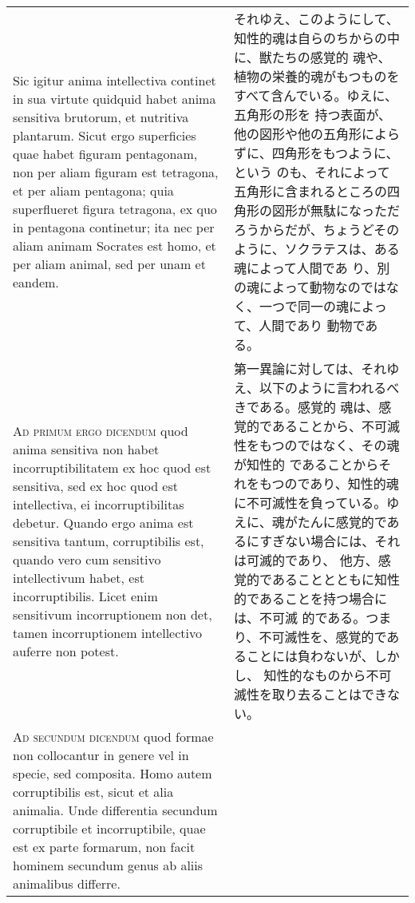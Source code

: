\documentclass[paper=a4paper,fontsize=10pt,jafontsize=9pt,titlepage]{jlreq}
\begin{document}
\begin{longtable}{p{21em}p{21em}}
\\

 Sic igitur anima intellectiva continet in sua virtute quidquid habet
 anima sensitiva brutorum, et nutritiva plantarum. Sicut ergo
 superficies quae habet figuram pentagonam, non per aliam figuram est
 tetragona, et per aliam pentagona; quia superflueret figura
 tetragona, ex quo in pentagona continetur; ita nec per aliam animam
 Socrates est homo, et per aliam animal, sed per unam et eandem.

&

それゆえ、このようにして、知性的魂は自らのちからの中に、獣たちの感覚的
魂や、植物の栄養的魂がもつものをすべて含んでいる。ゆえに、五角形の形を
持つ表面が、他の図形や他の五角形によらずに、四角形をもつように、という
のも、それによって五角形に含まれるところの四角形の図形が無駄になっただ
ろうからだが、ちょうどそのように、ソクラテスは、ある魂によって人間であ
り、別の魂によって動物なのではなく、一つで同一の魂によって、人間であり
動物である。
 
\\



 {\scshape Ad primum ergo dicendum} quod anima sensitiva non habet
incorruptibilitatem ex hoc quod est sensitiva, sed ex hoc quod est
intellectiva, ei incorruptibilitas debetur. Quando ergo anima est
sensitiva tantum, corruptibilis est, quando vero cum sensitivo
intellectivum habet, est incorruptibilis. Licet enim sensitivum
incorruptionem non det, tamen incorruptionem intellectivo auferre non
potest.


&

 第一異論に対しては、それゆえ、以下のように言われるべきである。感覚的
 魂は、感覚的であることから、不可滅性をもつのではなく、その魂が知性的
 であることからそれをもつのであり、知性的魂に不可滅性を負っている。ゆ
 えに、魂がたんに感覚的であるにすぎない場合には、それは可滅的であり、
 他方、感覚的であることとともに知性的であることを持つ場合には、不可滅
 的である。つまり、不可滅性を、感覚的であることには負わないが、しかし、
 知性的なものから不可滅性を取り去ることはできない。
 
\\



{\scshape Ad secundum dicendum} quod formae non collocantur in genere
vel in specie, sed composita. Homo autem corruptibilis est, sicut et
alia animalia. Unde differentia secundum corruptibile et
incorruptibile, quae est ex parte formarum, non facit hominem secundum
genus ab aliis animalibus differre.


\end{longtable}
\end{document}
